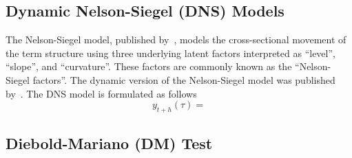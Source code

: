 \subsection{Dynamic Nelson-Siegel (DNS) Models}
\label{sec:dns}
The Nelson-Siegel model, published by~\textcite{Nelson1987}, models the cross-sectional movement of the term structure using three underlying latent factors interpreted as \enquote{level}, \enquote{slope}, and \enquote{curvature}. These factors are commonly known as the \enquote{Nelson-Siegel factors}. The dynamic version of the Nelson-Siegel model was published by~\textcite[hereafter DNS]{Diebold2006}. The DNS model is formulated as follows
\begin{equation}
	y_{t+h}(\tau) = 
\end{equation}

\subsection{Diebold-Mariano (DM) Test}
\label{sec:dmtest}
